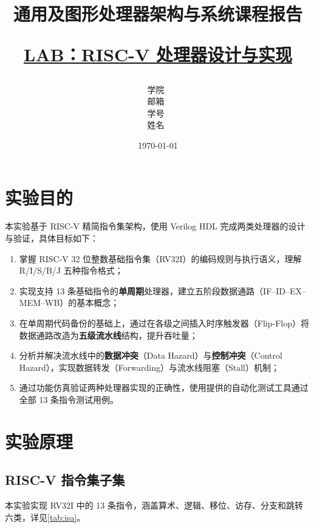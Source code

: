\documentclass[12pt,hyperref,a4paper,UTF8]{ctexart}
\title{
    \vspace{3cm}
    \heiti \Huge \textbf{{通用及图形处理器架构与系统课程报告}} \par
    \vspace{1cm}
    \heiti \Large {\underline{LAB：RISC-V 处理器设计与实现}}
    \vspace{3cm}
}
\author{
    \vspace{0.5cm}
    \kaishu\Large 学院\ \dlmu[9cm]{集成电路学院} \\
    \vspace{0.5cm}
    \kaishu\Large 邮箱\ \dlmu[9cm]{yuri\_cang@sjtu.edu.cn} \\
    \vspace{0.5cm}
    \kaishu\Large 学号\ \dlmu[9cm]{523031910352} \qquad \\
    \vspace{0.5cm}
    \kaishu\Large 姓名\ \dlmu[9cm]{方兴宇} \qquad \\
}
\date{\today}
\begin{document}
\cover
\tableofcontents
\newpage

\section{实验目的}

本实验基于 RISC-V 精简指令集架构，使用 Verilog HDL 完成两类处理器的设计与验证，具体目标如下：

\begin{enumerate}[leftmargin=2em]
    \item 掌握 RISC-V 32 位整数基础指令集（RV32I）的编码规则与执行语义，理解 R/I/S/B/J 五种指令格式；
    \item 实现支持 13 条基础指令的\textbf{单周期}处理器，建立五阶段数据通路（IF--ID--EX--MEM--WB）的基本概念；
    \item 在单周期代码备份的基础上，通过在各级之间插入时序触发器（Flip-Flop）将数据通路改造为\textbf{五级流水线}结构，提升吞吐量；
    \item 分析并解决流水线中的\textbf{数据冲突}（Data Hazard）与\textbf{控制冲突}（Control Hazard），实现数据转发（Forwarding）与流水线阻塞（Stall）机制；
    \item 通过功能仿真验证两种处理器实现的正确性，使用提供的自动化测试工具通过全部 13 条指令测试用例。
\end{enumerate}

\section{实验原理}

\subsection{RISC-V 指令集子集}

本实验实现 RV32I 中的 13 条指令，涵盖算术、逻辑、移位、访存、分支和跳转六类，详见\autoref{tab:isa}。
\end{document}
